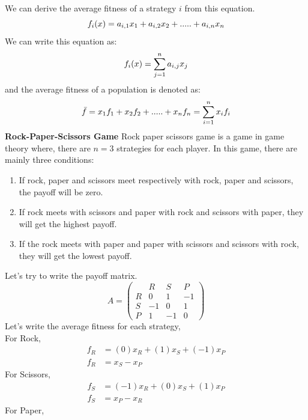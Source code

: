 \documentclass{article}
\begin{document}
We can derive the average fitness of a strategy $i$ from this equation.
\begin{equation}
f_i(x)=a_{i,1}x_1+a_{i,2}x_2+.....+a_{i,n}x_n\nonumber\\
\end{equation}
We can write this equation as:
\begin{equation}
f_i(x)=\sum_{j=1}^{n}a_{i,j}x_j\nonumber\\
\end{equation}
and the average fitness of a population is denoted as:
\begin{equation}
\bar{f}=x_1f_1+x_2f_2+.....+x_nf_n= \sum_{i=1}^{n}x_if_i\nonumber\\
\end{equation}
\textbf{Rock-Paper-Scissors Game}
\newline
Rock paper scissors game is a game in game theory where, there are $n=3$ strategies for each player. In this game, there are mainly three conditions:
\begin{enumerate}
\item If rock, paper and scissors meet respectively with rock, paper and scissors, the payoff will be zero.
\item If rock meets with scissors and paper with rock and scissors with paper, they will get the highest payoff.
\item If the rock meets with paper and paper with scissors and scissors with rock, they will get the lowest payoff.
\end{enumerate}
Let's try to write the payoff matrix.
\begin{equation}
A =
\begin{pmatrix}
  & R & S & P \\
R & 0 & 1 & -1 \\
S & -1 & 0 & 1 \\
P & 1 & -1 & 0
\end{pmatrix}
\end{equation}
Let's write the average fitness for each strategy,\\
For Rock,
\begin{align}
f_R &= (0)x_R + (1)x_S + (-1)x_P \nonumber\\
f_R &= x_S - x_P \nonumber
\end{align}
For Scissors,
\begin{align}
f_S &= (-1)x_R + (0)x_S + (1)x_P \nonumber\\
f_S &= x_P - x_R \nonumber
\end{align}
For Paper,
\end{document}
